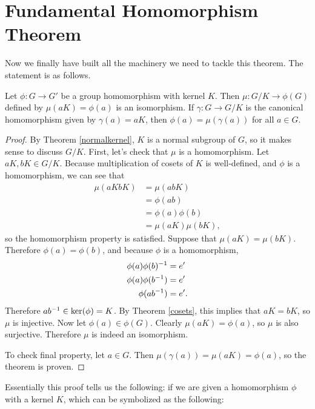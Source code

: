 \section{Fundamental Homomorphism Theorem}

Now we finally have built all the machinery we need to tackle this theorem. The statement is as follows.

\begin{theorem}
Let $\phi: G \to G'$ be a group homomorphism with kernel $K$. Then $\mu: G/K \to \phi(G)$ defined by $\mu(aK) = \phi(a)$ is an isomorphism. If $\gamma: G \to G/K$ is the canonical homomorphism given by $\gamma(a) = aK$, then $\phi(a) = \mu(\gamma(a))$ for all $a \in G$.
\end{theorem}

\begin{proof}
By Theorem \ref{normalkernel}, $K$ is a normal subgroup of $G$, so it makes sense to discuss $G/K$. First, let's check that $\mu$ is a homomorphism. Let $aK, bK \in G/K$. Because multiplication of cosets of $K$ is well-defined, and $\phi$ is a homomorphism, we can see that
\begin{align*}
    \mu(aKbK) &= \mu(abK) \\
    &= \phi(ab) \\
    &= \phi(a)\phi(b) \\
    &= \mu(aK)\mu(bK)\mathrm{,}
\end{align*}
so the homomorphism property is satisfied. Suppose that $\mu(aK) = \mu(bK).$ Therefore $\phi(a) = \phi(b)$, and because $\phi$ is a homomorphism,
\begin{align*}
    \phi(a)\phi(b)^{-1} &= e' \\
    \phi(a)\phi(b^{-1}) &= e' \\
    \phi(ab^{-1}) &= e'\mathrm{.}
\end{align*}
Therefore $ab^{-1} \in \ker(\phi) = K$. By Theorem \ref{cosets}, this implies that $aK = bK$, so $\mu$ is injective. Now let $\phi(a) \in \phi(G)$. Clearly $\mu(aK) = \phi(a)$, so $\mu$ is also surjective. Therefore $\mu$ is indeed an isomorphism.

To check final property, let $a \in G$. Then $\mu(\gamma(a)) = \mu(aK) = \phi(a)$, so the theorem is proven.

\end{proof}

Essentially this proof tells us the following: if we are given a homomorphism $\phi$ with a kernel $K$, which can be symbolized as the following:

